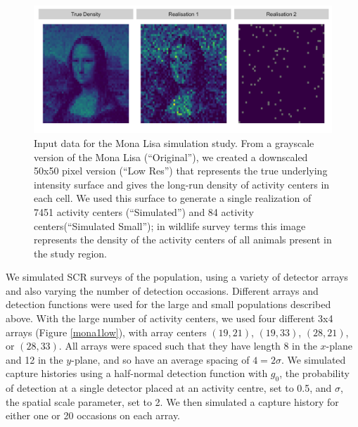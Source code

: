\documentclass[10pt,a4paper]{article}
\begin{document}
\begin{figure}[htbp]
\centering
\includegraphics[width=1\textwidth]{mona_inputdata.png}
\caption{Input data for the Mona Lisa simulation study. From a grayscale version of the Mona Lisa (``Original''), we created a downscaled 50x50 pixel version (``Low Res'') that represents the true underlying intensity surface and gives the long-run density of activity centers in each cell. We used this surface to generate a single realization of 7451 activity centers (``Simulated'') and 84 activity centers(``Simulated Small''); in wildlife survey terms this image represents the density of the activity centers of all animals present in the study region.}
\label{mlinputs}
\end{figure}

We simulated SCR surveys of the population, using a variety of detector arrays and also varying the number of detection occasions. Different arrays and detection functions were used for the large and small populations described above. With the large number of activity centers, we used four different 3x4 arrays (Figure \ref{mona1low}), with array centers $(19,21)$, $(19,33)$, $(28, 21)$, or $(28, 33)$. All arrays were spaced such that they have length 8 in the $x$-plane and 12 in the $y$-plane, and so have an average spacing of $4=2\sigma$. We simulated capture histories using a half-normal detection function with $g_0$, the probability of detection at a single detector placed at an activity centre, set to 0.5, and $\sigma$, the spatial scale parameter, set to 2. We then simulated a capture history for either one or 20 occasions on each array.
\end{document}
